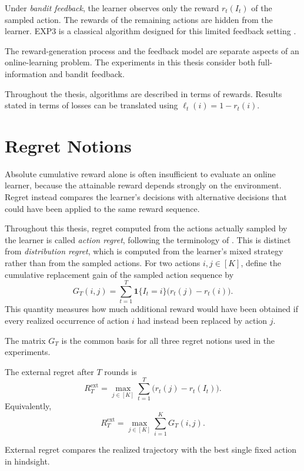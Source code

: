 Under \emph{bandit feedback}, the learner observes only the reward
\(r_t(I_t)\) of the sampled action. The rewards of the remaining actions are
hidden from the learner. EXP3 is a classical algorithm designed for this
limited feedback setting \citep{auer_nonstochastic_2002}.

The reward-generation process and the feedback model are separate aspects of
an online-learning problem. The experiments in this thesis consider both
full-information and bandit feedback.

Throughout the thesis, algorithms are described in terms of rewards. Results
stated in terms of losses can be translated using
\(\ell_t(i)=1-r_t(i)\).


\section{Regret Notions}
\label{sec:regret-notions}

Absolute cumulative reward alone is often insufficient to evaluate an online
learner, because the attainable reward depends strongly on the environment.
Regret instead compares the learner's decisions with alternative decisions
that could have been applied to the same reward sequence.

Throughout this thesis, regret computed from the actions actually sampled by
the learner is called \emph{action regret}, following the terminology of
\citet{greenwald_bounds_2006}. This is distinct from \emph{distribution
regret}, which is computed from the learner's mixed strategy rather than from
the sampled actions. For two actions \(i,j\in[K]\), define the cumulative
replacement gain of the sampled action sequence by
\[
    G_T(i,j)
    =
    \sum_{t=1}^{T}
    \mathbf{1}\{I_t=i\}
    \bigl(r_t(j)-r_t(i)\bigr).
\]
This quantity measures how much additional reward would have been obtained
if every realized occurrence of action \(i\) had instead been replaced by
action \(j\).

The matrix \(G_T\) is the common basis for all three regret notions used in
the experiments.

\begin{definition}
The external regret after \(T\) rounds is
\[
    R_T^{\mathrm{ext}}
    =
    \max_{j\in[K]}
    \sum_{t=1}^{T}
    \bigl(r_t(j)-r_t(I_t)\bigr).
\]
Equivalently,
\[
    R_T^{\mathrm{ext}}
    =
    \max_{j\in[K]}
    \sum_{i=1}^{K}G_T(i,j).
\]
\end{definition}

External regret compares the realized trajectory with the best single fixed
action in hindsight.

